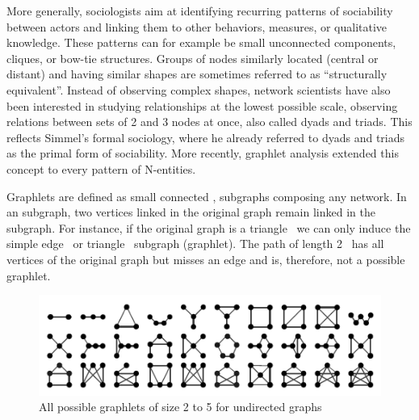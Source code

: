 More generally, sociologists aim at identifying recurring patterns of sociability between actors and linking them to other behaviors, measures, or qualitative knowledge.
These patterns can for example be small unconnected components, cliques, or bow-tie structures\cite{wassermanSocialNetworkAnalysis1994}.
Groups of nodes similarly located (central or distant) and having similar shapes are sometimes referred to as ``structurally equivalent''\cite{lemercier12FormalNetwork2015}.
Instead of observing complex shapes, network scientists have also been interested in studying relationships at the lowest possible scale, \ie observing relations between sets of 2 and 3 nodes at once, also called dyads and triads\cite{wassermanSocialNetworkAnalysis1994}.
This reflects Simmel's formal sociology, where he already referred to dyads and triads as the primal form of sociability\cite{Simmel2013}.
More recently, graphlet analysis extended this concept to every pattern of N-entities\cite{przuljBiologicalNetworkComparison2007}.

Graphlets are defined as small connected ,  subgraphs composing any network\cite{miloNetworkMotifsSimple2002}.
In an  subgraph, two vertices linked in the original graph remain linked in the subgraph.
For instance, if the original graph is a triangle \TRIANGLE\ we can only induce the simple edge \EDGE\ or triangle \TRIANGLE\ subgraph (graphlet).
The path of length 2 \PATH\ has all vertices of the original graph but misses an edge and is, therefore, not a possible graphlet.



\begin{figure}
    \centering %
    \includegraphics[width=1\textwidth]{static/figures/RelatedWork/all_graphlets_undir5}
    \caption{All possible graphlets of size 2 to 5 for undirected graphs}
    \label{fig:undir5-graphlets}
\end{figure}

